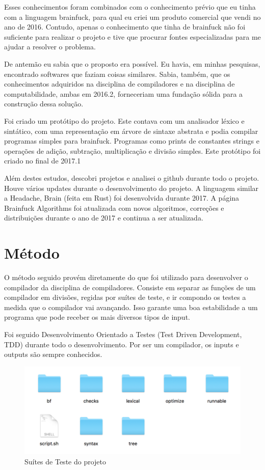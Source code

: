 Esses conhecimentos foram combinados com o conhecimento prévio que eu tinha com a linguagem brainfuck, para qual eu criei um produto comercial que vendi no ano de 2016. Contudo, apenas o conhecimento que tinha de brainfuck não foi suficiente para realizar o projeto e tive que procurar fontes especializadas para me ajudar a resolver o problema.

De antemão eu sabia que o proposto era possível. Eu havia, em minhas pesquisas, encontrado softwares que faziam coisas similares. Sabia, também, que os conhecimentos adquiridos na disciplina de compiladores e na disciplina de computabilidade, ambas em 2016.2, forneceriam uma fundação sólida para a construção dessa solução.

Foi criado um protótipo do projeto. Este contava com um analisador léxico e sintático, com uma representação em árvore de sintaxe abstrata e podia compilar programas simples para brainfuck. Programas como prints de constantes strings e operações de adição, subtração, multiplicação e divisão simples. Este protótipo foi criado no final de 2017.1

Além destes estudos, descobri projetos e analisei o github durante todo o projeto. Houve vários updates durante o desenvolvimento do projeto. A linguagem similar a Headache, Brain (feita em Rust) foi desenvolvida durante 2017. A página Brainfuck Algorithms foi atualizada com novos algoritmos, correções e distribuições durante o ano de 2017 e continua a ser atualizada. 

\section{Método}

O método seguido provém diretamente do que foi utilizado para desenvolver o compilador da disciplina de compiladores. Consiste em separar as funções de um compilador em divisões, regidas por suítes de teste, e ir compondo os testes a medida que o compilador vai avançando. Isso garante uma boa estabilidade a um programa que pode receber os mais diversos tipos de input. 

Foi seguido Desenvolvimento Orientado a Testes (Test Driven Development, TDD) durante todo o desenvolvimento. Por ser um compilador, os inputs e outputs são sempre conhecidos.

\begin{figure}[h]
	\includegraphics[]{TD/img/folders.png}
	\caption{Suítes de Teste do projeto}
	\label{folders}
\end{figure}

